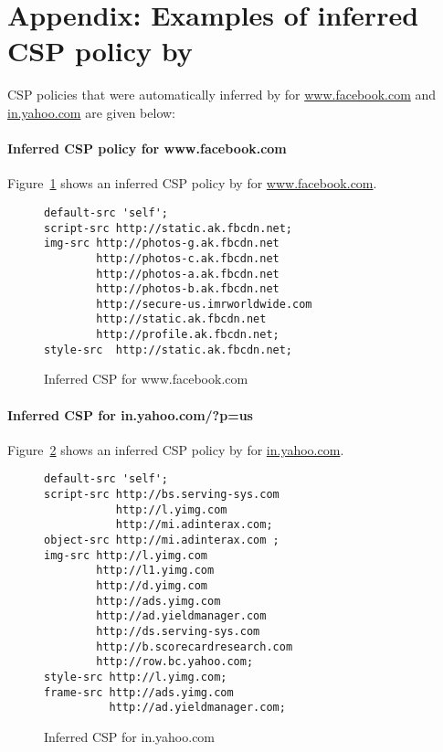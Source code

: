 \newpage
\section {Appendix: Examples of inferred CSP policy by \Codename}
\label{appendix}

CSP policies that were automatically inferred by \codename for
\url{www.facebook.com} and \url{in.yahoo.com} are given below:

\paragraph{\bf Inferred CSP policy for www.facebook.com}
Figure~\ref{fig:facebookCSP} shows an inferred CSP policy by \codename
for \url{www.facebook.com}.

\begin{figure}[h!]
\small
\begin{verbatim}
default-src 'self'; 
script-src http://static.ak.fbcdn.net; 
img-src http://photos-g.ak.fbcdn.net
        http://photos-c.ak.fbcdn.net 
        http://photos-a.ak.fbcdn.net 
        http://photos-b.ak.fbcdn.net 
        http://secure-us.imrworldwide.com 
        http://static.ak.fbcdn.net 
        http://profile.ak.fbcdn.net; 
style-src  http://static.ak.fbcdn.net;  
\end{verbatim}
\caption{Inferred CSP for www.facebook.com}
\label{fig:facebookCSP}
\end{figure}



\paragraph{\bf Inferred CSP for in.yahoo.com/?p=us}
Figure~\ref{fig:yahooCSP} shows an inferred CSP policy by \codename
for \url{in.yahoo.com}.

\begin{figure}[h!]
\small
\begin{verbatim}
default-src 'self'; 
script-src http://bs.serving-sys.com 
           http://l.yimg.com 
           http://mi.adinterax.com; 
object-src http://mi.adinterax.com ;
img-src http://l.yimg.com 
        http://l1.yimg.com 
        http://d.yimg.com 
        http://ads.yimg.com 
        http://ad.yieldmanager.com 
        http://ds.serving-sys.com 
        http://b.scorecardresearch.com 
        http://row.bc.yahoo.com; 
style-src http://l.yimg.com; 
frame-src http://ads.yimg.com 
          http://ad.yieldmanager.com; 
\end{verbatim}
\caption{Inferred CSP for in.yahoo.com}
\label{fig:yahooCSP}
\end{figure}


